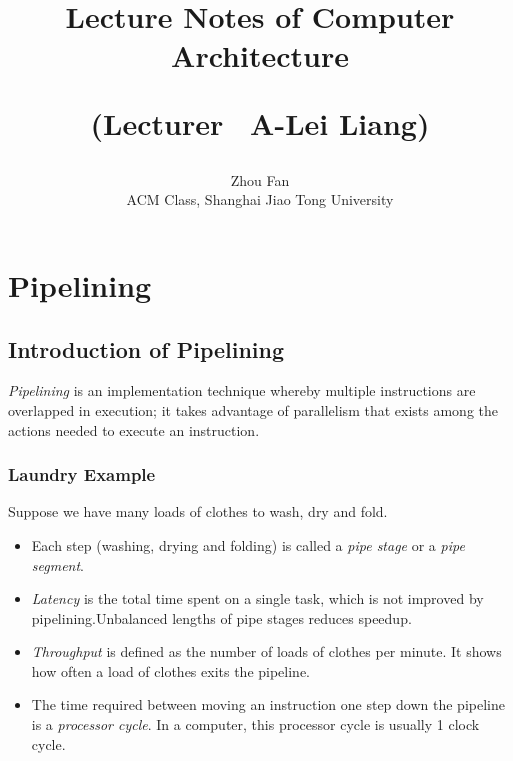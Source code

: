 \documentclass[12pt, a4paper]{article}
\title{Lecture Notes of Computer Architecture\\\begin{large}(Lecturer \ A-Lei Liang)\end{large}}
\author{Zhou Fan\\ACM Class, Shanghai Jiao Tong University}
\date{}
\theoremstyle{margin}
\begin{document}
\maketitle
\tableofcontents
\newpage

\section{Pipelining}

  \subsection{Introduction of Pipelining}

    \indent 

    \emph{Pipelining} is an implementation technique whereby multiple instructions are overlapped in execution; it takes advantage of parallelism that exists among the actions needed to execute an instruction.\cite{caqa}

    \subsubsection{Laundry Example}
      \indent 

      Suppose we have many loads of clothes to wash, dry and fold. 

      \begin{itemize}
        \item Each step (washing, drying and folding) is called a \emph{pipe stage} or a \emph{pipe segment}. 
        \item \emph{Latency} is the total time spent on a single task, which is not improved by pipelining.Unbalanced lengths of pipe stages reduces speedup. 
        \item \emph{Throughput} is defined as the number of loads of clothes per minute. It shows how often a load of clothes exits the pipeline.
        \item The time required between moving an instruction one step down the pipeline is a \emph{processor cycle}. In a computer, this processor cycle is usually 1 clock cycle.\cite{caqa}
      \end{itemize}
\end{document}
